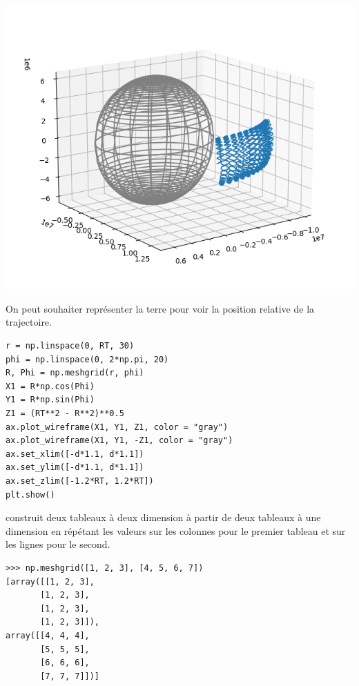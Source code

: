 \begin{Answer}
\begin{center}
\includegraphics[width=14cm]{Cours/Images/ED2_vanHalen2.png}    
\end{center}
\end{Answer}
On peut souhaiter représenter la terre pour voir la position relative de la trajectoire.
\begin{lstlisting}
r = np.linspace(0, RT, 30)
phi = np.linspace(0, 2*np.pi, 20)
R, Phi = np.meshgrid(r, phi)
X1 = R*np.cos(Phi)
Y1 = R*np.sin(Phi)
Z1 = (RT**2 - R**2)**0.5
ax.plot_wireframe(X1, Y1, Z1, color = "gray")
ax.plot_wireframe(X1, Y1, -Z1, color = "gray")
ax.set_xlim([-d*1.1, d*1.1])
ax.set_ylim([-d*1.1, d*1.1])
ax.set_zlim([-1.2*RT, 1.2*RT])
plt.show()
\end{lstlisting}
 construit deux tableaux à deux dimension à partir de deux tableaux à une dimension en répétant les valeurs sur les colonnes pour le premier tableau et sur les lignes pour le second.
\begin{lstlisting}
>>> np.meshgrid([1, 2, 3], [4, 5, 6, 7])
[array([[1, 2, 3],
       [1, 2, 3],
       [1, 2, 3],
       [1, 2, 3]]), 
array([[4, 4, 4],
       [5, 5, 5],
       [6, 6, 6],
       [7, 7, 7]])]
\end{lstlisting}

